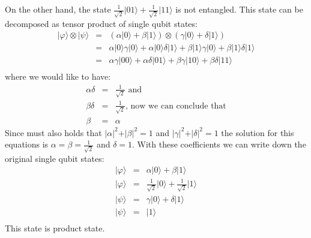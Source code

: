 \documentclass[a4paper,10pt]{article}
\newcommand{\qb}[1]{\ensuremath{\vert{#1}\rangle}}
\begin{document}
\begin{enumerate}[a)]
On the other hand, the state $\frac{1}{\sqrt{2}}\qb{01} + \frac{1}{\sqrt{2}}\qb{11}$ is not entangled. This state can be decomposed as tensor product of single qubit states:
\begin{eqnarray*}
\qb{\varphi} \otimes \qb{\psi} &=& \left( \alpha \qb{0} + \beta\qb{1} \right) \otimes \left( \gamma \qb{0} + \delta \qb{1} \right)\\
&=& \alpha \qb{0}\gamma \qb{0} + \alpha \qb{0}\delta\qb{1}  + \beta\qb{1}\gamma \qb{0} + \beta{\qb{1}}\delta \qb{1} \\
&=& \alpha\gamma\qb{00} + \alpha\delta\qb{01} + \beta\gamma\qb{10} + \beta\delta\qb{11}\\
\end{eqnarray*}
where we would like to have:
\begin{eqnarray*}
\alpha\delta&=&\frac{1}{\sqrt{2}} \text{ and}\\
\beta\delta&=&\frac{1}{\sqrt{2}} \text{, now we can conclude that}\\
\beta &=& \alpha
\end{eqnarray*}
Since must also holds that $\vert \alpha \vert ^2 + \vert \beta \vert ^2 = 1$ and $\vert \gamma \vert ^2 + \vert \delta \vert ^2 = 1$ the solution for this equations is $\alpha=\beta=\frac{1}{\sqrt{2}}$ and $\delta=1$. With these coefficients we can write down the original single qubit states:
\begin{eqnarray*}
\qb{\varphi} &=& \alpha\qb{0}+ \beta\qb{1}\\
\qb{\varphi} &=& \frac{1}{\sqrt{2}}\qb{0} +\frac{1}{\sqrt{2}}\qb{1}\\
\qb{\psi} &=& \gamma\qb{0} +\delta\qb{1}\\
\qb{\psi} &=& \qb{1}\\
\end{eqnarray*}
This state is product state.
\end{enumerate}
\end{document}
